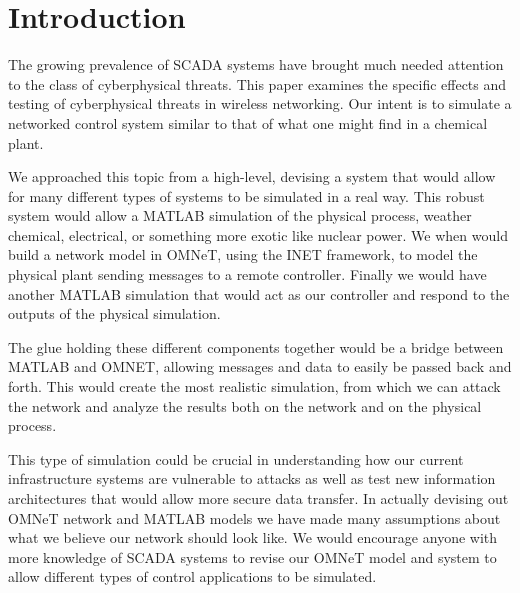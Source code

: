 \section{Introduction}
The growing prevalence of SCADA systems have brought much needed attention to the class of cyberphysical threats.  This paper examines the specific effects and testing of cyberphysical threats in wireless networking.  Our intent is to simulate a networked control system similar to that of what one might find in a chemical plant. 

We approached this topic from a high-level, devising a system that would allow for many different types of systems to be simulated in a real way. This robust system would allow a MATLAB simulation of the physical process, weather chemical, electrical, or something more exotic like nuclear power. We when would build a network model in OMNeT, using the INET framework, to model the physical plant sending messages to a remote controller. Finally we would have another MATLAB simulation that would act as our controller and respond to the outputs of the physical simulation. 

The glue holding these different components together would be a bridge between MATLAB and OMNET, allowing messages and data to easily be passed back and forth. This would create the most realistic simulation, from which we can attack the network and analyze the results both on the network and on the physical process. 

This type of simulation could be crucial in understanding how our current infrastructure systems are vulnerable to attacks as well as test new information architectures that would allow more secure data transfer. In actually devising out OMNeT network and MATLAB models we have made many assumptions about what we believe our network should look like. We would encourage anyone with more knowledge of SCADA systems to revise our OMNeT model and system to allow different types of control applications to be simulated.  
